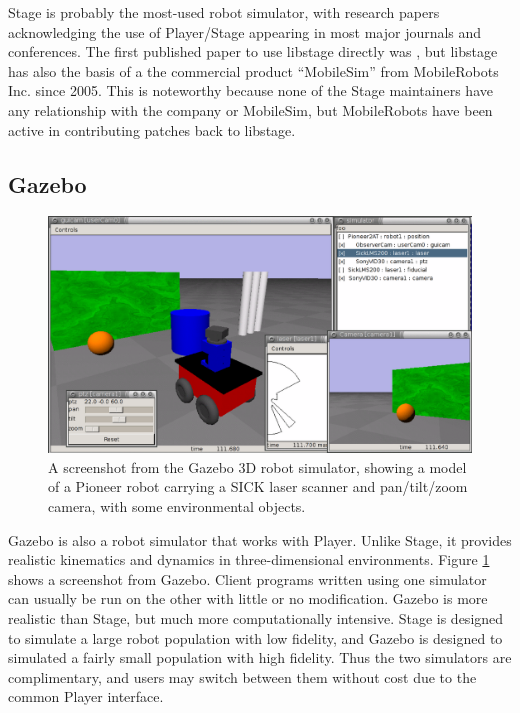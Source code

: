 Stage is probably the most-used robot simulator, with research papers
acknowledging the use of Player/Stage appearing in most major journals
and conferences. The first published paper to use libstage directly
was \cite{32_Zhang06}, but libstage has also the basis of a the
commercial product ``MobileSim'' from MobileRobots Inc. since
2005. This is noteworthy because none of the Stage maintainers have
any relationship with the company or MobileSim, but MobileRobots have
been active in contributing patches back to libstage.

\subsection{Gazebo}

\begin{figure}[top]
\begin{center}
\includegraphics[width=\columnwidth]{ps_gazebo}
\caption{\label{fig:ch32-gazebo}A screenshot from the Gazebo 3D robot simulator,
 showing a model of a Pioneer robot carrying a SICK laser scanner and
 pan/tilt/zoom camera, with some environmental objects.}
\end{center}
\end{figure}

Gazebo is also a robot simulator that works with Player. Unlike Stage,
it provides realistic kinematics and dynamics in three-dimensional
environments. Figure \ref{fig:ch32-gazebo} shows a screenshot from
Gazebo. Client programs written using one simulator can usually be run
on the other with little or no modification. Gazebo is more realistic
than Stage, but much more computationally intensive. Stage is designed
to simulate a large robot population with low fidelity, and Gazebo is
designed to simulated a fairly small population with high
fidelity. Thus the two simulators are complimentary, and users may
switch between them without cost due to the common Player interface.

